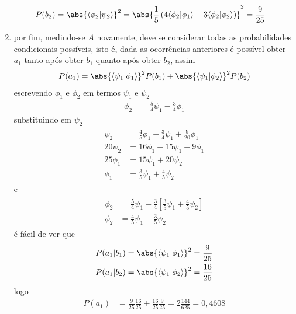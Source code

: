 \begin{prob}
\begin{sol}
\begin{enumerate}[label=\alph *)]
\begin{subequations}
\begin{align}
							P(b_{2}) &= \abs{\langle{\phi_{2}}|{\psi_{2}}\rangle}^{2}=\abs{\frac{1}{5}\left(4\langle{\phi_{2}}|{\phi_{1}}\rangle-3\langle{\phi_{2}}|{\phi_{2}}\rangle\right)}^{2}=\frac{9}{25}
						\end{align}
					\end{subequations}
				\item por fim, medindo-se $A$ novamente, deve se considerar todas as probabilidades condicionais possíveis, isto é, dada as ocorrências anteriores é possível obter $a_{1}$ tanto após obter $b_1$ quanto após obter $b_{2}$, assim 
						\begin{align}
							P(a_{1}) & = \abs{\langle{\psi_{1}}|{\phi_{1}}\rangle}^{2}P(b_{1})+\abs{\langle{\psi_{1}}|{\phi_{2}}\rangle}^{2}P(b_{2})\\
						\end{align}
						escrevendo $\phi_{1}$ e $\phi_{2}$ em termos $\psi_{1}$ e $\psi_{2}$
						\begin{align}
						  \phi_{2} &= \frac{5}{4}\psi_{1} - \frac{3}{4} \phi_{1}
						\end{align}
						substituindo em $\psi_{2}$
						\begin{align}
							\begin{split}
								\psi_{2} &= \frac{4}{5} \phi_{1}-\frac{3}{4} \psi_{1}+\frac{9}{20} \phi_{1}\\
								20 \psi_{2} &= 16 \phi_{1}-15 \psi_{1}+9 \phi_{1}\\
								25 \phi_{1} &= 15 \psi_{1}+20 \psi_{2}\\
								\phi_{1} &= \frac{3}{5} \psi_{1}+\frac{4}{5} \psi_{2}
							\end{split}
						\end{align}
						e
						\begin{align}
							\begin{split}
								\phi_{2}&=\frac{5}{4} \psi_{1}-\frac{3}{4}\left[\frac{3}{5} \psi_{1}+\frac{4}{5} \psi_{2}\right]\\
								\phi_{2}&=\frac{4}{5} \psi_{1}-\frac{3}{5} \psi_{2}
							\end{split}
						\end{align}
						é fácil de ver que
						\begin{align}
							P(a_{1}|b_{1}) &= \abs{\langle{\psi_{1}}|{\phi_{1}}\rangle}^{2}=\frac{9}{25}\\
							P(a_{1}|b_{2}) &= \abs{\langle{\psi_{1}}|{\phi_{2}}\rangle}^{2}=\frac{16}{25}
						\end{align}
						logo
						\begin{align}
							P(a_{1}) &= \frac{9}{25}\frac{16}{25}+\frac{16}{25}\frac{9}{25} = 2\frac{144}{625}=0,4608
						\end{align}
		 	\end{enumerate}
		 \end{sol}
	 \end{prob}

